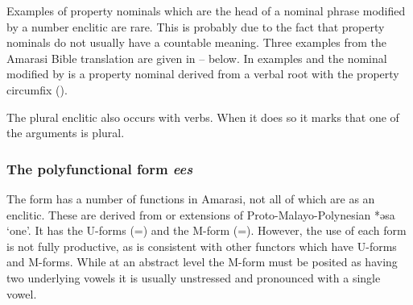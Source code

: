 Examples of property nominals which are the head of a nominal phrase
modified by a number enclitic are rare.
This is probably due to the fact that property nominals
do not usually have a countable meaning.
Three examples from the Amarasi Bible translation
are given in -- below.
In examples  and  the nominal
modified by  is a property nominal derived from
a verbal root with the property circumfix  ().

\begin{exe}
	\label{ex:Luke 8:17}
	\label{ex:Genesis 33:11}
	\label{ex:Genesis 24:22}
\end{exe}

The plural enclitic  also occurs with verbs.
When it does so it marks that one of the arguments is plural.

\subsubsection{The polyfunctional form \it{ees}}\label{sec:PolFunEs}
The form  has a number of functions in Amarasi,
not all of which are as an enclitic.
These are derived from or extensions of Proto-Malayo-Polynesian *əsa `one'.
It has the U-forms (=) and the M-form (=).
However, the use of each form is not fully productive,
as is consistent with other functors which have U-forms and M-forms.
While at an abstract level the M-form must be posited as having
two underlying vowels  it is usually unstressed
and pronounced with a single vowel.

